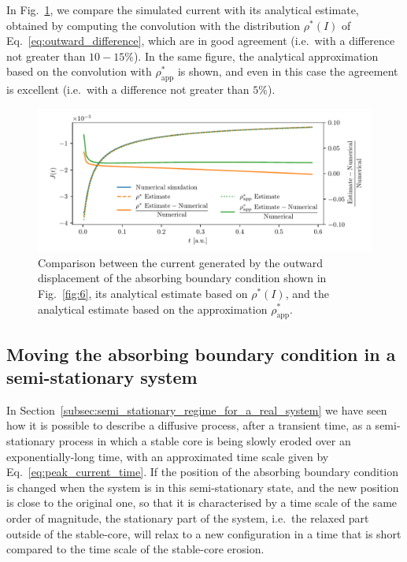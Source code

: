 In Fig.~\ref{fig:7}, we compare the simulated current with its analytical estimate, obtained by computing the convolution with the distribution $\rho^\ast(I)$ of Eq.~\eqref{eq:outward_difference}, which are in good agreement {(i.e.\ with a difference not greater than $10-15\%$)}. In the same figure, the analytical approximation based on the convolution with $\rho^\ast_\text{app}$ is shown, and even in this case the agreement is excellent {(i.e.\ with a difference not greater than $5\%$)}.

\begin{figure}[htp]
    \centering
    \includegraphics[width=\textwidth]{4_probing_the_diffusive_behavior/figs/final/current_outwards.pdf}
    \caption{Comparison between the current generated by the outward displacement of the absorbing boundary condition shown in Fig.~\ref{fig:6}, its analytical estimate based on $\rho^\ast(I)$, and the analytical estimate based on the approximation $\rho^\ast_\text{app}$.}
    \label{fig:7}
\end{figure}


\subsection{Moving the absorbing boundary condition in a semi-stationary system}
\label{subsec:Moving_the_boundary_in_a_semi_stationary_system}


In Section~\ref{subsec:semi_stationary_regime_for_a_real_system} we have seen how it is possible to describe a diffusive process, after a transient time, as a semi-stationary process in which a stable core is being slowly eroded over an exponentially-long time, with an approximated time scale given by Eq.~\eqref{eq:peak_current_time}. If the position of the absorbing boundary condition is changed when the system is in this semi-stationary state, and the new position is close to the original one, so that it is characterised by a time scale of the same order of magnitude, the stationary part of the system, i.e.\ the relaxed part outside of the stable-core, will relax to a new configuration in a time that is short compared to the time scale of the stable-core erosion.


